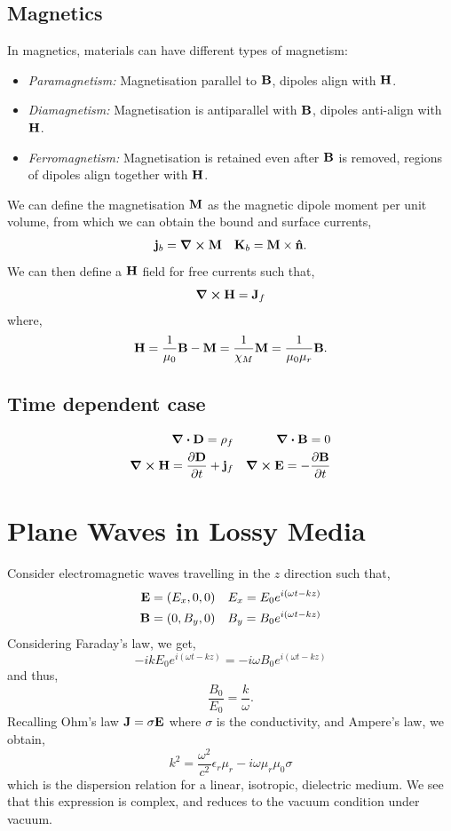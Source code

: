 \documentclass{book}
\begin{document}
\subsection{Magnetics}
In magnetics, materials can have different types of magnetism:
\begin{itemize}
	\item \textit{Paramagnetism:} Magnetisation parallel to $\vb{B}$, dipoles align with $\vb{H}$.
	\item \textit{Diamagnetism:} Magnetisation is antiparallel with $\vb{B}$, dipoles anti-align with $\vb{H}$.
	\item \textit{Ferromagnetism:} Magnetisation is retained even after $\vb{B}$ is removed, regions of dipoles align together with $\vb{H}$.
\end{itemize}
We can define the magnetisation $\vb{M}$ as the magnetic dipole moment per unit volume, from which we can obtain the bound and surface currents,
\begin{align}
	\vb{j}_b = \curl{\vb{M}} && \vb{K}_b = \vb{M} \times \vu{n}.
\end{align}
We can then define a $\vb{H}$ field for free currents such that,
\begin{equation}
	\curl{\vb{H}} = \vb{J}_f
\end{equation}
where,
\begin{equation}
	\vb{H} = \frac{1}{\mu_0}\vb{B} - \vb{M} = \frac{1}{\chi_M}\vb{M} = \frac{1}{\mu_0\mu_r}\vb{B}.
\end{equation}
\subsection{Time dependent case}
\begin{align}
	\div{\vb{D}} = \rho_f && \div{\vb{B}} = 0\\
	\curl{\vb{H}} = \pdv{\vb{D}}{t} + \vb{j}_f && \curl{\vb{E}} = -\pdv{\vb{B}}{t}
\end{align}
\section{Plane Waves in Lossy Media}
Consider electromagnetic waves travelling in the $z$ direction such that,
\begin{align}
	\vb{E} = \left(E_x, 0, 0\right) && E_x = E_0e^{i(\omega t - kz)} \\
	\vb{B} = \left(0, B_y, 0\right) && B_y = B_0e^{i(\omega t - kz)}
\end{align}
Considering Faraday's law, we get,
\begin{equation}
	-ikE_0e^{i(\omega t - kz)} = -i\omega B_0 e^{i(\omega t - kz)}
\end{equation}
and thus,
\begin{equation}
	\frac{B_0}{E_0} = \frac{k}{\omega}.
\end{equation}
Recalling Ohm's law $\vb{J} = \sigma \vb{E}$ where $\sigma$ is the conductivity, and Ampere's law, we obtain,
\begin{equation}
	k^2 = \frac{\omega^2}{c^2} \epsilon_r\mu_r - i\omega \mu_r\mu_0 \sigma 
\end{equation}
which is the dispersion relation for a linear, isotropic, dielectric medium. We see that this expression is complex, and reduces to the vacuum condition under vacuum. 
\end{document}
